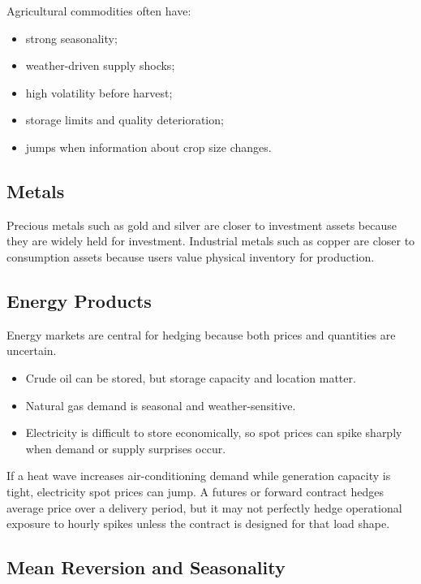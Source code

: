 Agricultural commodities often have:
\begin{itemize}
    \item strong seasonality;
    \item weather-driven supply shocks;
    \item high volatility before harvest;
    \item storage limits and quality deterioration;
    \item jumps when information about crop size changes.
\end{itemize}

\subsection{Metals}

Precious metals such as gold and silver are closer to investment assets because
they are widely held for investment. Industrial metals such as copper are closer
to consumption assets because users value physical inventory for production.

\subsection{Energy Products}

Energy markets are central for hedging because both prices and quantities are
uncertain.
\begin{itemize}
    \item Crude oil can be stored, but storage capacity and location matter.
    \item Natural gas demand is seasonal and weather-sensitive.
    \item Electricity is difficult to store economically, so spot prices can
    spike sharply when demand or supply surprises occur.
\end{itemize}

\begin{exmp}
If a heat wave increases air-conditioning demand while generation capacity is
tight, electricity spot prices can jump. A futures or forward contract hedges
average price over a delivery period, but it may not perfectly hedge operational
exposure to hourly spikes unless the contract is designed for that load shape.
\end{exmp}

\subsection{Mean Reversion and Seasonality}

